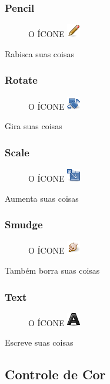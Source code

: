 \documentclass[12pt,onecolumn]{article}
\begin{document}
    \subsubsection{Pencil}
      \begin{figure}[H]
        O ÍCONE
        \includegraphics{gimp-icons/stock-tool-pencil-22.png}
        \label{fig:pencil}
      \end{figure}
      Rabisca suas coisas
      
    \subsubsection{Rotate}
      \begin{figure}[H]
        O ÍCONE
        \includegraphics{gimp-icons/stock-tool-rotate-22.png}
        \label{fig:rotate}
      \end{figure}
      Gira suas coisas
      
    \subsubsection{Scale}
      \begin{figure}[H]
        O ÍCONE
        \includegraphics{gimp-icons/stock-tool-scale-22.png}
        \label{fig:scale}
      \end{figure}
      Aumenta suas coisas

    \subsubsection{Smudge}
      \begin{figure}[H]
        O ÍCONE
        \includegraphics{gimp-icons/stock-tool-smudge-22.png}
        \label{fig:smudge}
      \end{figure}
      Também borra suas coisas
      
    \subsubsection{Text}
      \begin{figure}[H]
        O ÍCONE
        \includegraphics{gimp-icons/stock-tool-text-22.png}
        \label{fig:text}
      \end{figure}
      Escreve suas coisas



  \subsection{Controle de Cor}
  \label{sec:color_control}
\end{document}
